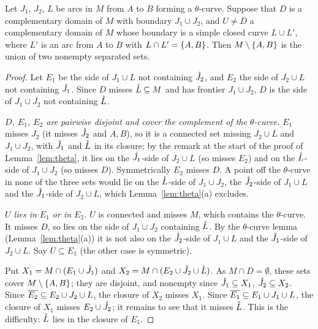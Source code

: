 \begin{lemma}\label{lem:theta-sep}
Let $J_1$, $J_2$, $L$ be arcs in $M$ from $A$ to $B$ forming a $\theta$-curve. Suppose that $D$ is a complementary domain of $M$ with boundary $J_1\cup J_2$, and $U\ne D$ a complementary domain of
$M$ whose boundary is a simple closed curve $L\cup L'$, where $L'$ is an arc from $A$ to $B$ with $L\cap L'=\left\{ A,B \right\}$. Then $M\setminus\left\{ A,B \right\}$ is the union of two nonempty separated sets.
\end{lemma}

\begin{proof}
Let $E_1$ be the side of $J_1\cup L$ not containing $\mathring{J}_2$, and $E_2$ the side of $J_2\cup L$ not containing $\mathring{J}_1$. Since $D$
misses $\mathring{L}\subseteq M$ and has frontier $J_1\cup J_2$, $D$ is the side of $J_1\cup J_2$ not containing $\mathring{L}$.

\emph{$D$, $E_1$, $E_2$ are pairwise disjoint and cover the complement of the $\theta$-curve.} $E_1$ misses $J_2$ (it misses $\mathring{J}_2$ and $A,B$), so it is a
connected set missing $J_2\cup L$ and $J_1\cup J_2$, with $\mathring{J}_1$ and $\mathring{L}$ in its closure; by the remark at the start of the proof of
Lemma~\ref{lem:theta}, it lies on the $\mathring{J}_1$-side of $J_2\cup L$ (so misses $E_2$) and on the $\mathring{L}$-side of $J_1\cup J_2$ (so misses $D$). Symmetrically
$E_2$ misses $D$. A point off the $\theta$-curve in none of the three sets would lie on the $\mathring{L}$-side of $J_1\cup J_2$, the $\mathring{J}_2$-side of $J_1\cup L$ and the
$\mathring{J}_1$-side of $J_2\cup L$, which Lemma~\ref{lem:theta}(a) excludes.

\emph{$U$ lies in $E_1$ or in $E_2$.} $U$ is connected and misses $M$, which contains the $\theta$-curve. It misses $D$, so lies on the side of $J_1\cup J_2$ containing $\mathring{L}$. By the $\theta$-curve lemma
(Lemma~\ref{lem:theta}(a)) it is not also on the $\mathring{J}_2$-side of $J_1\cup L$ and the $\mathring{J}_1$-side of $J_2\cup L$. Say $U\subseteq E_1$ (the other case is symmetric).

Put $X_1=M\cap(E_1\cup\mathring{J}_1)$ and $X_2=M\cap(E_2\cup\mathring{J}_2\cup\mathring{L})$. As $M\cap D=\emptyset$, these sets cover $M\setminus\left\{ A,B \right\}$; they are disjoint, and nonempty since $\mathring{J}_1\subseteq X_1$, $\mathring{J}_2\subseteq X_2$.
Since $\overline{E_2}\subseteq E_2\cup J_2\cup L$, the closure of $X_2$ misses $X_1$. Since $\overline{E_1}\subseteq E_1\cup J_1\cup L$, the closure of $X_1$ misses $E_2\cup\mathring{J}_2$; it remains to see that it misses $\mathring{L}$. This is the
difficulty: $\mathring{L}$ lies in the closure of $E_1$.


\end{proof}
